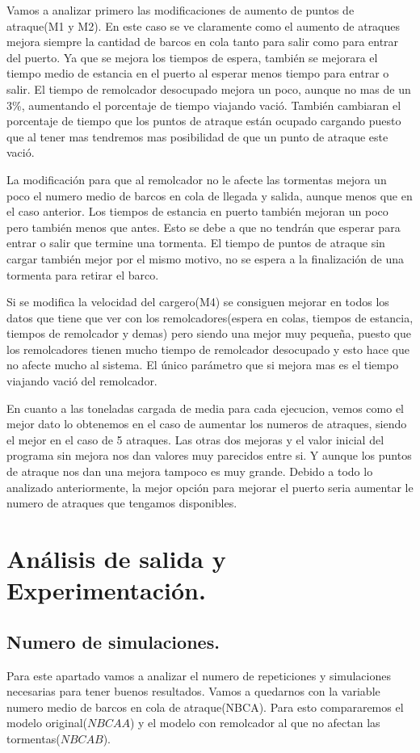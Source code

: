 \documentclass[]{article}
\begin{document}
Vamos a analizar primero las modificaciones de aumento de puntos de atraque(M1 y M2). En este caso se ve claramente como el aumento de atraques mejora siempre la cantidad de barcos en cola tanto para salir como para entrar del puerto. Ya que se mejora los tiempos de espera, también se mejorara el tiempo medio de estancia en el puerto al esperar menos tiempo para entrar o salir. El tiempo de remolcador desocupado mejora un poco, aunque no mas de un 3\%, aumentando el porcentaje de tiempo viajando vació. También cambiaran el porcentaje de tiempo que los puntos de atraque están ocupado cargando puesto que al tener mas tendremos mas posibilidad de que un punto de atraque este vació.

La modificación para que al remolcador no le afecte las tormentas mejora un poco el numero medio de barcos en cola de llegada y salida, aunque menos que en el caso anterior. Los tiempos de estancia en puerto también mejoran un poco pero también menos que antes. Esto se debe a que no tendrán que esperar para entrar o salir que termine una tormenta. El tiempo de puntos de atraque sin cargar también mejor por el mismo motivo, no se espera a la finalización de una tormenta para retirar el barco.

Si se modifica la velocidad del cargero(M4) se consiguen mejorar en todos los datos que tiene que ver con los remolcadores(espera en colas, tiempos de estancia, tiempos de remolcador y demas) pero siendo una mejor muy pequeña, puesto que los remolcadores tienen mucho tiempo de remolcador desocupado y esto hace que no afecte mucho al sistema. El único parámetro que si mejora mas es el tiempo viajando vació del remolcador. 

En cuanto a las toneladas cargada de media para cada ejecucion, vemos como el mejor dato lo obtenemos en el caso de aumentar los numeros de atraques, siendo el mejor en el caso de 5 atraques. Las otras dos mejoras y el valor inicial del programa sin mejora nos dan valores muy parecidos entre si. Y aunque los puntos de atraque nos dan una mejora tampoco es muy grande. 
Debido a todo lo analizado anteriormente, la mejor opción para mejorar el puerto seria aumentar le numero de atraques que tengamos disponibles.

\section{Análisis de salida y Experimentación.}
\subsection{Numero de simulaciones.}
Para este apartado vamos a analizar el numero de repeticiones y simulaciones necesarias para tener buenos resultados. Vamos a quedarnos con la variable numero medio de barcos en cola de atraque(NBCA). Para esto compararemos el modelo original($NBCAA$) y el modelo con remolcador al que no afectan las tormentas($NBCAB$). 
\end{document}

